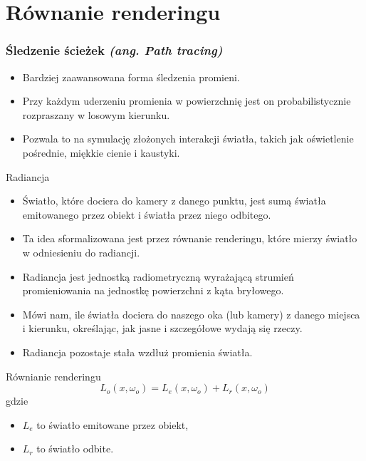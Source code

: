 \documentclass{beamer}
\begin{document}
\section{Równanie renderingu}
\begin{frame}
\frametitle{Śledzenie ścieżek \it{(ang. Path tracing)}}
\begin{itemize}
    \item Bardziej zaawansowana forma śledzenia promieni.
    \item Przy każdym uderzeniu promienia w powierzchnię jest on probabilistycznie rozpraszany w losowym kierunku.
    \item Pozwala to na symulację złożonych interakcji światła, takich jak oświetlenie pośrednie, miękkie cienie i kaustyki.
\end{itemize}
\end{frame}

\begin{frame}{Radiancja}
    \begin{itemize}
        \item Światło, które dociera do kamery z danego punktu, jest sumą światła emitowanego przez obiekt i światła przez niego odbitego.
        \item Ta idea sformalizowana jest przez równanie renderingu, które mierzy światło w odniesieniu do radiancji.
        \item Radiancja jest jednostką radiometryczną wyrażającą strumień promieniowania na jednostkę powierzchni z kąta bryłowego.
        \item Mówi nam, ile światła dociera do naszego oka (lub kamery) z danego miejsca i kierunku, określając, jak jasne i szczegółowe wydają się rzeczy.
        \item Radiancja pozostaje stała wzdłuż promienia światła.
    \end{itemize}
\end{frame}

\begin{frame}{Równianie renderingu}
$$ L_o(x, \omega_o) = L_e(x, \omega_o) + L_r(x, \omega_o) $$
gdzie
\begin{itemize}
    \item $L_e$ to światło emitowane przez obiekt,
    \item $L_r$ to światło odbite.
\end{itemize}
\end{frame}
\end{document}
